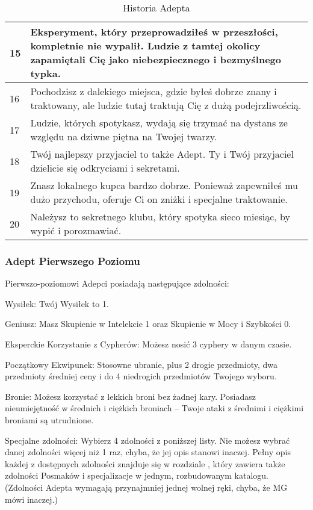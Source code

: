 \begin{table*}[t]
\begin{tabularx}{\textwidth}{| p{} | X |}
    15 & Eksperyment, który przeprowadziłeś w przeszłości, kompletnie nie wypalił. Ludzie z tamtej okolicy zapamiętali Cię jako niebezpiecznego i bezmyślnego typka. \\ \hline
    16 & Pochodzisz z dalekiego miejsca, gdzie byłeś dobrze znany i traktowany, ale ludzie tutaj traktują Cię z dużą podejrzliwością. \\ \hline
    17 & Ludzie, których spotykasz, wydają się trzymać na dystans ze względu na dziwne piętna na Twojej twarzy. \\ \hline
    18 & Twój najlepszy przyjaciel to także Adept. Ty i Twój przyjaciel dzielicie się odkryciami i sekretami. \\ \hline
    19 & Znasz lokalnego kupca bardzo dobrze. Ponieważ zapewniłeś mu dużo przychodu, oferuje Ci on zniżki i specjalne traktowanie.  \\ \hline
    20 & Należysz to sekretnego klubu, który spotyka sieco miesiąc, by wypić i porozmawiać. \\ \hline
 \end{tabularx}
  \caption {Historia Adepta}
  \label {Historia Adepta}
 \end{table*}
 
 \subsubsection{Adept Pierwszego Poziomu}
 
 Pierwszo-poziomowi Adepci posiadają następujące zdolności:
 
Wysiłek: Twój Wysiłek to 1.

Geniusz: Masz Skupienie w Intelekcie 1 oraz Skupienie w Mocy i Szybkości 0.

Eksperckie Korzystanie z Cypherów: Możesz nosić 3 cyphery w danym czasie.

Początkowy Ekwipunek: Stosowne ubranie, plus 2 drogie przedmioty, dwa przedmioty średniej ceny i do 4 niedrogich przedmiotów Twojego wyboru.

Bronie: Możesz korzystać z lekkich broni bez żadnej kary. Posiadasz nieumiejętność w średnich i ciężkich broniach – Twoje ataki z średnimi i ciężkimi broniami są utrudnione.

Specjalne zdolności: Wybierz 4 zdolności z poniższej listy. Nie możesz wybrać danej zdolności więcej niż 1 raz, chyba, że jej opis stanowi inaczej. Pełny opis każdej z dostępnych zdolności znajduje się w rozdziale , który zawiera także zdolności Posmaków i specjalizacje w jednym, rozbudowanym katalogu. (Zdolności Adepta wymagają przynajmniej jednej wolnej ręki, chyba, że MG mówi inaczej.)

